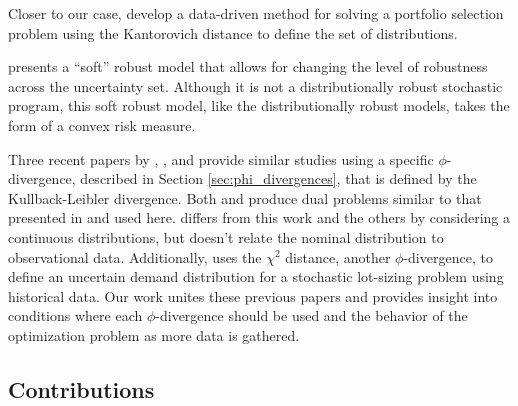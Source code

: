 \documentclass[12pt]{article}
\theoremstyle{plain}
\theoremstyle{definition}
\theoremstyle{remark}
\begin{document}
Closer to our case, \citet{pflug2007ambiguity} develop a data-driven method for solving a portfolio selection problem using the Kantorovich distance to define the set of distributions.

\citet{bental2010soft} presents a ``soft'' robust model that allows for changing the level of robustness across the uncertainty set.
Although it is not a distributionally robust stochastic program, this soft robust model, like the distributionally robust models, takes the form of a convex risk measure.

Three recent papers by \citet{wang2010likelihood}, \citet{calafiore2007ambiguous}, and \citet{hukullback} provide similar studies using a specific $\phi$-divergence, described in Section \ref{sec:phi_divergences}, that is defined by the Kullback-Leibler divergence.
Both \citep{wang2010likelihood} and \citep{hukullback} produce dual problems similar to that presented in \citep{bental2011robust} and used here.
\citet{hukullback} differs from this work and the others by considering a continuous distributions, but doesn't relate the nominal distribution to observational data.
Additionally, \citet{klabjan2013robust} uses the $\chi^2$ distance, another $\phi$-divergence, to define an uncertain demand distribution for a stochastic lot-sizing problem using historical data.
Our work unites these previous papers and provides insight into conditions where each $\phi$-divergence should be used and the behavior of the optimization problem as more data is gathered.

\subsection{Contributions}
\end{document}
